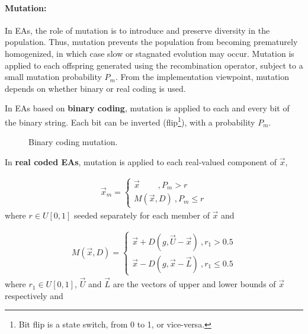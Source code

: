\paragraph{Mutation:}
In EAs, the role of mutation is to introduce and preserve diversity in the population. Thus, mutation prevents the population from becoming prematurely homogenized, in which case slow or stagnated evolution may occur. Mutation is applied to each offspring generated using the recombination operator, subject to a small mutation probability $P_m$. From the implementation viewpoint, mutation depends on whether binary or real coding is used.

In EAs based on {\bf binary coding}, mutation is applied to each and every bit of the binary string. Each bit can be inverted (flip\footnote{Bit flip is a state switch, from 0 to 1, or vice-versa.}), with a probability $P_m$.      

\begin{figure}[h!]
\begin{minipage}[b]{1\linewidth}
 \centering
\end{minipage}
\caption{Binary coding mutation.}
\label{binarymut}
\end{figure}

In {\bf real coded EAs},  mutation is applied to each real-valued component of $\vec{x}$, 

\begin{eqnarray}
	\vec{x}_m={\left\{ 
	\begin{array}{ll}
    \vec{x}~~~~~~~~~~,\mbox{$P_m > r$}\\
	M(\vec{x},D)~,\mbox{$P_m \leq r$}
    \end{array} \right. }
    \label{}
\end{eqnarray}
where $r\in U[0,1]$ seeded separately for each member of $\vec{x}$ and

\begin{eqnarray}
	M(\vec{x},D)={\left\{ 
	\begin{array}{ll}
    \vec{x}+D(g,\vec{U}-\vec{x})~,\mbox{$r_1 > 0.5$}\\
	\vec{x}-D(g,\vec{x}-\vec{L})~,\mbox{$r_1 \leq 0.5$}
    \end{array} \right. }
    \label{}
\end{eqnarray}
where $r_1\in U[0,1]$, $\vec{U}$ and $\vec{L}$ are the vectors of upper and lower bounds of $\vec{x}$ respectively and  

